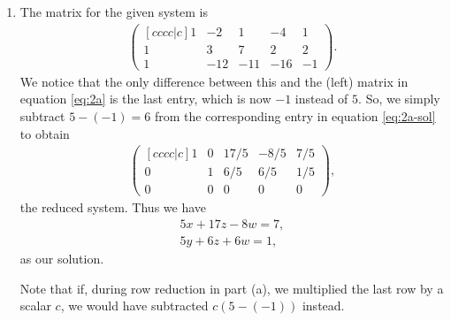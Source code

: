 \documentclass[a4paper]{article}
\begin{document}
\begin{enumerate}
\begin{enumerate}
			\item The matrix for the given system is
			\begin{align*}
				\begin{pmatrix}[cccc|c]
					  1 &  -2 &   1 &  -4 &   1 \\
					  1 &   3 &   7 &   2 &   2 \\
					  1 & -12 & -11 & -16 &  -1
				\end{pmatrix}.
			\end{align*}
			We notice that the only difference between this and the (left) matrix in equation \eqref{eq:2a} is the last entry, which is now $-1$ instead of $5$. So, we simply subtract $5 - (-1) = 6$ from the corresponding entry in equation \eqref{eq:2a-sol} to obtain
			\begin{align*}
				\begin{pmatrix}[cccc|c]
					  1 &   0 & 17/5 & -8/5 & 7/5 \\
					  0 &   1 &  6/5 &  6/5 & 1/5 \\
					  0 &   0 &    0 &    0 &   0
				\end{pmatrix},
			\end{align*}
			the reduced system. Thus we have
			\begin{align*}
				5x + 17z - 8w = 7, \\
				5y + 6z + 6w = 1,
			\end{align*}
			as our solution.
			
			Note that if, during row reduction in part (a), we multiplied the last row by a scalar $c$, we would have subtracted $c(5 - (-1))$ instead.
		\end{enumerate}
		

\end{enumerate}
\end{document}
